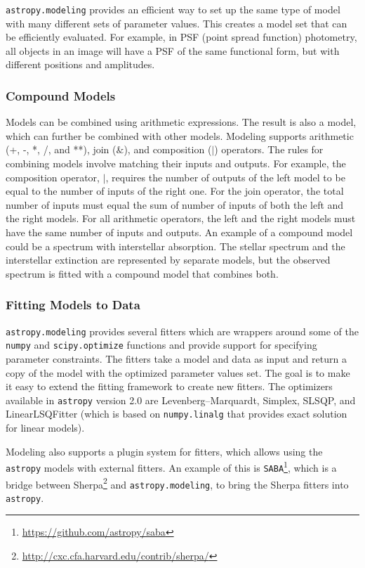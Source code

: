 \documentclass[modern]{aastex61}
\newcommand{\package}[1]{\texttt{#1}\xspace}
\newcommand{\astropypkg}{\package{astropy}}
\newcommand{\inlinecomment}[2]{\todo[inline]{#1: #2}\xspace}
\begin{document}
\package{astropy.modeling} provides an efficient way to set up the same type of model with many different sets of parameter values.
This creates a model set that can be efficiently evaluated. For example, in PSF (point spread function) photometry, all objects in an image will have a PSF of the same functional form, but with different positions and amplitudes.

\subsubsection{Compound Models}
Models can be combined using arithmetic expressions. The result is also a model, which can further be combined with other models. Modeling supports arithmetic (+, -, *, /, and **), join ($\&$), and composition ($|$) operators. The rules for combining models involve matching their inputs and outputs. For example, the composition operator, $|$, requires the number of outputs of the left model to be equal to the number of inputs of the right one. For the join operator, the total number of inputs must equal the sum of number of inputs of both the left and the right models. For all arithmetic operators, the left and the right models must have the same number of inputs and outputs. An example of a compound model could be a spectrum with interstellar absorption. The stellar spectrum and the interstellar extinction are represented by separate models, but the observed spectrum is fitted with a compound model that combines both.

\subsubsection{Fitting Models to Data}

\package{astropy.modeling} provides several fitters which are wrappers around some of the \texttt{numpy} and \texttt{scipy.optimize} functions and provide support for specifying parameter constraints. The fitters take a model and data as input and return a copy of the model with the optimized parameter values set. The goal is to make it easy to extend the fitting framework to create new fitters. The optimizers available in \astropypkg version 2.0 are Levenberg--Marquardt, Simplex, SLSQP, and LinearLSQFitter (which is based on \texttt{numpy.linalg} that provides exact solution for linear models).


Modeling also supports a plugin system for fitters, which allows using the
\astropypkg models with external fitters. An example of this is
\package{SABA}\footnote{\url{https://github.com/astropy/saba}}, which is a bridge between
Sherpa\footnote{\url{http://cxc.cfa.harvard.edu/contrib/sherpa/}}
and \package{astropy.modeling}, to bring the Sherpa fitters into \astropypkg.
\end{document}
